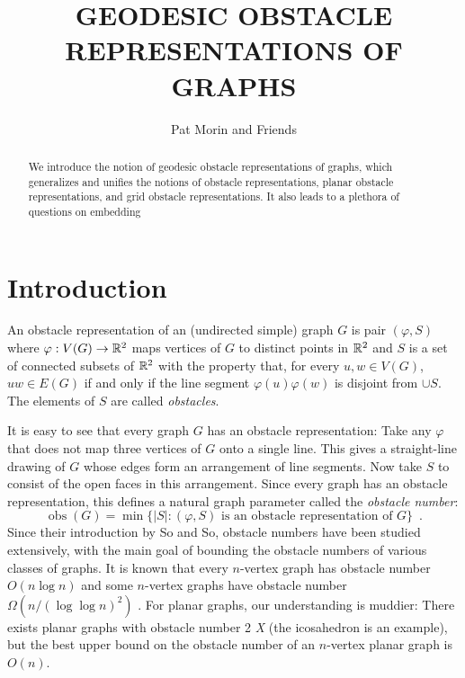 \documentclass{patmorin}
\title{\MakeUppercase{Geodesic Obstacle Representations of Graphs}}
\author{Pat Morin and Friends}%
\DeclareMathOperator{\ob}{obs}
\begin{document}
\begin{titlepage}
\maketitle

\begin{abstract}
  We introduce the notion of geodesic obstacle representations of graphs,
  which generalizes and unifies the notions of obstacle representations,
  planar obstacle representations, and grid obstacle representations.
  It also leads to a plethora of questions on embedding 
\end{abstract}
\end{titlepage}

\tableofcontents

\newpage


\section{Introduction}

An obstacle representation of an (undirected simple) graph $G$ is
pair $(\varphi, S)$ where $\varphi:V(G)\to\mathbb{R}^2$ maps vertices of $G$
to distinct points in $\mathbb{R}^2$ and $S$ is a set of connected subsets of
$\mathbb{R}^2$ with the property that, for every $u,w\in V(G)$, $uw\in E(G)$
if and only if the line segment $\varphi(u)\varphi(w)$ is disjoint from
$\cup S$.  The elements of $S$ are called \emph{obstacles}.

It is easy to see that every graph $G$ has an obstacle representation:
Take any $\varphi$ that does not map three vertices of $G$ onto a single
line. This gives a straight-line drawing of $G$ whose edges form an
arrangement of line segments.  Now take $S$ to consist of the open faces
in this arrangement.  Since every graph has an obstacle representation,
this defines a natural graph parameter called the \emph{obstacle number}:
\[
     \ob(G) = \min\{|S| :\text{$(\varphi, S)$ is an obstacle representation of $G$}\} \enspace .
\]
Since their introduction by So and So, obstacle numbers have been studied
extensively, with the main goal of bounding the obstacle numbers of
various classes of graphs.  It is known that every $n$-vertex graph has
obstacle number $O(n\log n)$ \cite{X} and some $n$-vertex graphs have
obstacle number $\Omega(n/(\log\log n)^2)$ \cite{Y}.  For planar graphs,
our understanding is muddier: There exists planar graphs with obstacle
number 2 \emph{X} (the icosahedron is an example), but the best upper
bound on the obstacle number of an $n$-vertex planar graph is $O(n)$.
\end{document}
